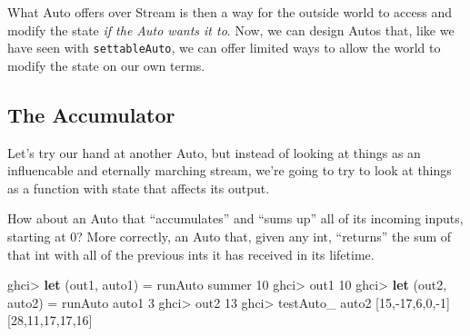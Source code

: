 \documentclass[]{article}
\newenvironment{Shaded}{}{}
\newcommand{\KeywordTok}[1]{\textcolor[rgb]{0.00,0.44,0.13}{\textbf{{#1}}}}
\newcommand{\DataTypeTok}[1]{\textcolor[rgb]{0.56,0.13,0.00}{{#1}}}
\newcommand{\DecValTok}[1]{\textcolor[rgb]{0.25,0.63,0.44}{{#1}}}
\newcommand{\CommentTok}[1]{\textcolor[rgb]{0.38,0.63,0.69}{\textit{{#1}}}}
\newcommand{\OtherTok}[1]{\textcolor[rgb]{0.00,0.44,0.13}{{#1}}}
\newcommand{\FunctionTok}[1]{\textcolor[rgb]{0.02,0.16,0.49}{{#1}}}
\newcommand{\NormalTok}[1]{{#1}}
\begin{document}
What Auto offers over Stream is then a way for the outside world to
access and modify the state \emph{if the Auto wants it to}. Now, we can
design Autos that, like we have seen with \texttt{settableAuto}, we can
offer limited ways to allow the world to modify the state on our own
terms.

\subsection{The Accumulator}\label{the-accumulator}

Let's try our hand at another Auto, but instead of looking at things as
an influencable and eternally marching stream, we're going to try to
look at things as a function with state that affects its output.

How about an Auto that ``accumulates'' and ``sums up'' all of its
incoming inputs, starting at 0? More correctly, an Auto that, given any
int, ``returns'' the sum of that int with all of the previous ints it
has received in its lifetime.

\begin{Shaded}
\end{Shaded}

\begin{Shaded}
\begin{Highlighting}[]
\NormalTok{ghci}\FunctionTok{>} \KeywordTok{let} \NormalTok{(out1, auto1) }\FunctionTok{=} \NormalTok{runAuto summer }\DecValTok{10}
\NormalTok{ghci}\FunctionTok{>} \NormalTok{out1}
\DecValTok{10}
\NormalTok{ghci}\FunctionTok{>} \KeywordTok{let} \NormalTok{(out2, auto2) }\FunctionTok{=} \NormalTok{runAuto auto1 }\DecValTok{3}
\NormalTok{ghci}\FunctionTok{>} \NormalTok{out2}
\DecValTok{13}
\NormalTok{ghci}\FunctionTok{>} \NormalTok{testAuto_ auto2 [}\DecValTok{15}\NormalTok{,}\FunctionTok{-}\DecValTok{17}\NormalTok{,}\DecValTok{6}\NormalTok{,}\DecValTok{0}\NormalTok{,}\FunctionTok{-}\DecValTok{1}\NormalTok{]}
\NormalTok{[}\DecValTok{28}\NormalTok{,}\DecValTok{11}\NormalTok{,}\DecValTok{17}\NormalTok{,}\DecValTok{17}\NormalTok{,}\DecValTok{16}\NormalTok{]}
\end{Highlighting}
\end{Shaded}
\end{document}
